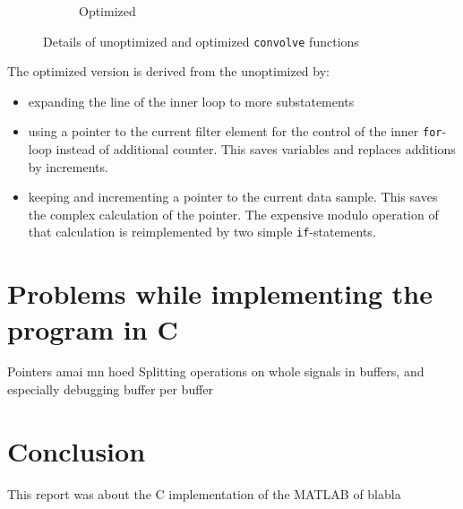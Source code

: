\documentclass[a4paper]{article}
\begin{document}
\begin{figure}[htpb]
{\begin{subfigure}[c]{.7\textwidth}
\caption{Optimized}
\end{subfigure}
}
\caption{Details of unoptimized and optimized \texttt{convolve} functions}
\label{fig:convolvefunctions}
\end{figure}
\begin{minipage}{\textwidth}
The optimized version is derived from the unoptimized by:
\begin{itemize}
\item expanding the line of the inner loop to more substatements
\item using a pointer to the current filter element for the control of the inner \texttt{for}-loop instead of additional counter. This saves variables and replaces additions by increments.
\item keeping and incrementing a pointer to the current data sample. This saves the complex calculation of the pointer. The expensive modulo operation of that calculation is reimplemented by two simple \texttt{if}-statements.
\end{itemize}
\end{minipage}
\section{Problems while implementing the program in C}
Pointers amai mn hoed
Splitting operations on whole signals in buffers, and especially debugging buffer per buffer
\section{Conclusion}
This report was about the C implementation of the MATLAB of blabla
\end{document}
